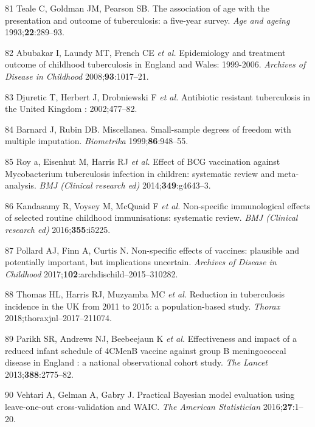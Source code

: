 \documentclass[11pt,twoside]{bristolthesis}
\begin{document}
  \leavevmode\hypertarget{ref-Teale1993}{}%
  81 Teale C, Goldman JM, Pearson SB. The association of age with the presentation and outcome of tuberculosis: a five-year survey. \emph{Age and ageing} 1993;\textbf{22}:289--93.
  
  \leavevmode\hypertarget{ref-Abubakar2008}{}%
  82 Abubakar I, Laundy MT, French CE \emph{et al.} Epidemiology and treatment outcome of childhood tuberculosis in England and Wales: 1999-2006. \emph{Archives of Disease in Childhood} 2008;\textbf{93}:1017--21.
  
  \leavevmode\hypertarget{ref-Djuretic2002}{}%
  83 Djuretic T, Herbert J, Drobniewski F \emph{et al.} Antibiotic resistant tuberculosis in the United Kingdom : 2002;477--82.
  
  \leavevmode\hypertarget{ref-Barnard1999}{}%
  84 Barnard J, Rubin DB. Miscellanea. Small-sample degrees of freedom with multiple imputation. \emph{Biometrika} 1999;\textbf{86}:948--55.
  
  \leavevmode\hypertarget{ref-Roy2014b}{}%
  85 Roy a, Eisenhut M, Harris RJ \emph{et al.} Effect of BCG vaccination against Mycobacterium tuberculosis infection in children: systematic review and meta-analysis. \emph{BMJ (Clinical research ed)} 2014;\textbf{349}:g4643--3.
  
  \leavevmode\hypertarget{ref-Kandasamy2016}{}%
  86 Kandasamy R, Voysey M, McQuaid F \emph{et al.} Non-specific immunological effects of selected routine childhood immunisations: systematic review. \emph{BMJ (Clinical research ed)} 2016;\textbf{355}:i5225.
  
  \leavevmode\hypertarget{ref-Pollard2017}{}%
  87 Pollard AJ, Finn A, Curtis N. Non-specific effects of vaccines: plausible and potentially important, but implications uncertain. \emph{Archives of Disease in Childhood} 2017;\textbf{102}:archdischild--2015--310282.
  
  \leavevmode\hypertarget{ref-Thomas2018}{}%
  88 Thomas HL, Harris RJ, Muzyamba MC \emph{et al.} Reduction in tuberculosis incidence in the UK from 2011 to 2015: a population-based study. \emph{Thorax} 2018;thoraxjnl--2017--211074.
  
  \leavevmode\hypertarget{ref-Parikh2016a}{}%
  89 Parikh SR, Andrews NJ, Beebeejaun K \emph{et al.} Effectiveness and impact of a reduced infant schedule of 4CMenB vaccine against group B meningococcal disease in England : a national observational cohort study. \emph{The Lancet} 2013;\textbf{388}:2775--82.
  
  \leavevmode\hypertarget{ref-Vehtari2016}{}%
  90 Vehtari A, Gelman A, Gabry J. Practical Bayesian model evaluation using leave-one-out cross-validation and WAIC. \emph{The American Statistician} 2016;\textbf{27}:1--20.
  
\end{document}
